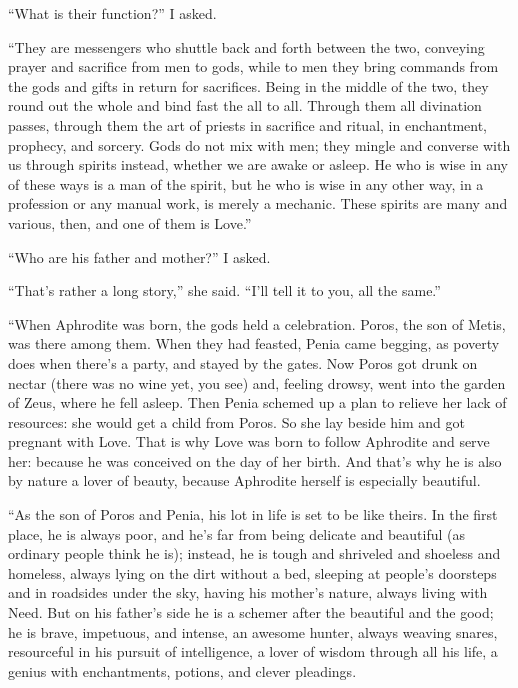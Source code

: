 “What is their function?” I asked.

“They are messengers who shuttle back and forth between the two,
conveying prayer and sacrifice from men to gods, while to men they bring
commands from the gods and gifts in return for sacrifices. Being in the
middle of the two, they round out the whole and bind fast the all to
all.  Through them all divination passes, through them
the art of priests in sacrifice and ritual, in enchantment, prophecy,
and sorcery. Gods do not mix with men; they mingle and converse with us
through spirits instead, whether we are awake or asleep. He who is wise
in any of these ways is a man of the spirit, but he who is wise in any
other way, in a profession or any manual work, is merely a mechanic.
These spirits are many and various, then, and one of them is Love.”

 “Who are his father and mother?” I asked.

“That's rather a long story,” she said. “I'll tell it to you, all the
same.”

“When Aphrodite was born, the gods held a celebration. Poros, the son of
Metis, was there among
them. When they had
feasted, Penia came begging, as poverty does when there's a party, and
stayed by the gates. Now Poros got drunk on nectar (there was no wine
yet, you see) and, feeling drowsy, went into the garden of Zeus, where
he fell asleep. Then  Penia schemed up a plan to relieve her lack
of resources: she would get a child from Poros. So she lay beside him
and got pregnant with Love. That is why Love was born to follow
Aphrodite and serve her: because he was conceived on the day of her
birth. And that's why he is also by nature a lover of beauty, because
Aphrodite herself is especially beautiful.

“As the son of Poros and Penia, his lot in life is set to be like
theirs. In the first place, he is always poor, and he's far from being
delicate and  beautiful (as ordinary people think he is);
instead, he is tough and shriveled and shoeless and homeless, always
lying on the dirt without a bed, sleeping at people's doorsteps and in
roadsides under the sky, having his mother's nature, always living with
Need. But on his father's side he is a schemer after the beautiful and
the good; he is brave, impetuous, and intense, an awesome hunter, always
weaving snares, resourceful in his pursuit of intelligence, a lover of
wisdom through all
his life, a genius with enchantments, potions, and clever pleadings.

